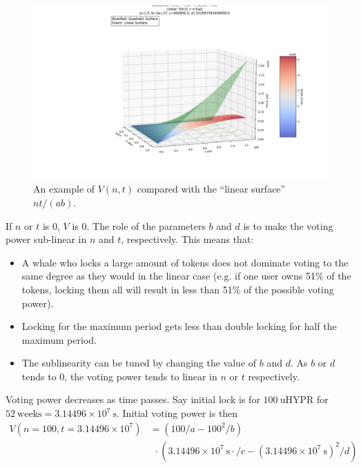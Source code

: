 \documentclass{article}
\begin{document}
\begin{figure}[h]
    \centering
    \includegraphics[width=\textwidth]{voting-power-surface.png}
    \caption{An example of $V(n, t)$ compared with the ``linear surface'' $n t / (a b)$.}
    \label{fig:voting-power}
\end{figure}

If $n$ or $t$ is $0$, $V$ is $0$.
The role of the parameters $b$ and $d$ is to make the voting power sub-linear in $n$ and $t$, respectively.
This means that:
\begin{itemize}
    \item A whale who locks a large amount of tokens does not dominate voting to the same degree as they would in the linear case (e.g. if one user owns 51\% of the tokens, locking them all will result in less than 51\% of the possible voting power).
    \item Locking for the maximum period gets less than double locking for half the maximum period.
    \item The sublinearity can be tuned by changing the value of $b$ and $d$.
      As $b$ or $d$ tends to $0$, the voting power tends to linear in $n$ or $t$ respectively.
\end{itemize}

Voting power decreases as time passes.
Say initial lock is for $100~\text{uHYPR}$ for $52~\text{weeks} = 3.14496 \times 10^7~\text{s}$.
Initial voting power is then
\begin{equation}
\begin{aligned}
V(n=100, t=3.14496 \times 10^7) &= (100/a - 100^2/b) \\
	&~~ \cdot (3.14496 \times 10^7~\text{s}\cdot /c - (3.14496 \times 10^7~\text{s})^2/d)
\end{aligned}
\end{equation}
\end{document}
